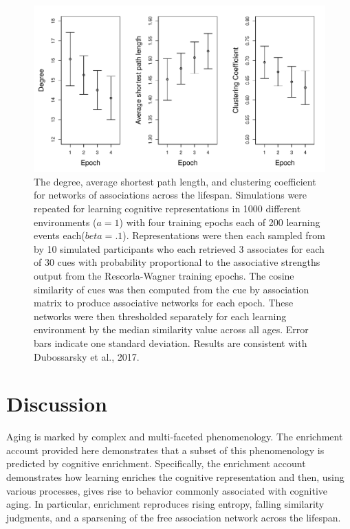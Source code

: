 \documentclass[
  man,floatsintext]{apa6}
\begin{document}
\begin{figure}

{\centering \includegraphics[width=1\linewidth]{NetworkAssociations1000} 

}

\caption{The degree, average shortest path length, and clustering coefficient for networks of associations across the lifespan. Simulations were repeated for learning cognitive representations in 1000 different environments ($a=1$) with four training epochs each of 200 learning events each($beta=.1$). Representations were then each sampled from by 10 simulated participants who each retrieved 3 associates for each of 30 cues with probability proportional to the associative strengths output from the Rescorla-Wagner training epochs. The cosine similarity of cues was then computed from the cue by association matrix to produce associative networks for each epoch. These networks were then thresholded separately for each learning environment by the median similarity value across all ages. Error bars indicate one standard deviation. Results are consistent with Dubossarsky et al., 2017.}\label{fig:Figure5}
\end{figure}

\hypertarget{discussion}{%
\section{Discussion}\label{discussion}}

Aging is marked by complex and multi-faceted phenomenology. The enrichment account provided here demonstrates that a subset of this phenomenology is predicted by cognitive enrichment. Specifically, the enrichment account demonstrates how learning enriches the cognitive representation and then, using various processes, gives rise to behavior commonly associated with cognitive aging. In particular, enrichment reproduces rising entropy, falling similarity judgments, and a sparsening of the free association network across the lifespan.
\end{document}
